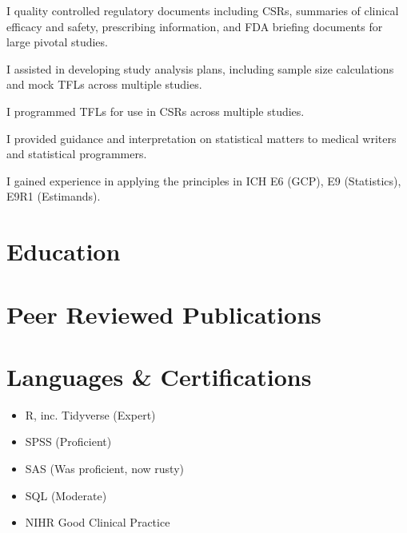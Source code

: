 \documentclass[11pt,a4paper,]{awesome-cv}
\providecommand{\tightlist}{%
	\setlength{\itemsep}{0pt}\setlength{\parskip}{0pt}}
\begin{document}
\begin{cventries}
{\begin{cvitems}
\item I quality controlled regulatory documents including CSRs, summaries of clinical efficacy and safety, prescribing information, and FDA briefing documents for large pivotal studies.
\item I assisted in developing study analysis plans, including sample size calculations and mock TFLs across multiple studies.
\item I programmed TFLs for use in CSRs across multiple studies.
\item I provided guidance and interpretation on statistical matters to medical writers and statistical programmers.
\item I gained experience in applying the principles in ICH E6 (GCP), E9 (Statistics), E9R1 (Estimands).
\end{cvitems}}
\end{cventries}

\hypertarget{education}{%
\section{Education}\label{education}}

\begin{cventries}
    \vspace{-4.0mm}
\end{cventries}

\hypertarget{peer-reviewed-publications}{%
\section{Peer Reviewed Publications}\label{peer-reviewed-publications}}

\hypertarget{languages-certifications}{%
\section{Languages \& Certifications}\label{languages-certifications}}

\begin{itemize}
\tightlist
\item
  R, inc. Tidyverse (Expert)
\item
  SPSS (Proficient)
\item
  SAS (Was proficient, now rusty)
\item
  SQL (Moderate)
\item
  NIHR Good Clinical Practice
\end{itemize}
\end{document}
